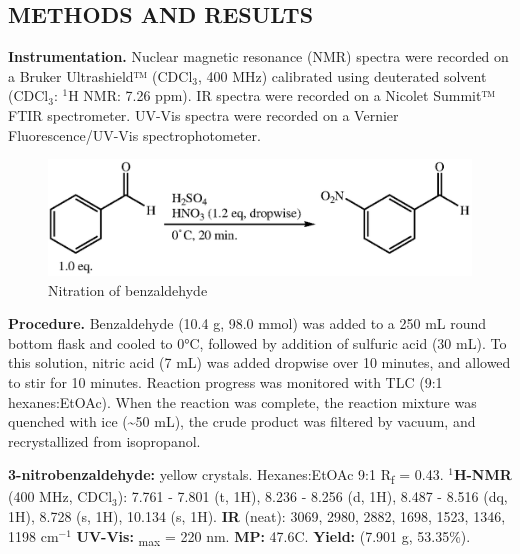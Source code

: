 \documentclass[12pt]{article}
\let\bf\textbf
\begin{document}
\subsection*{METHODS AND RESULTS}
\bf{Instrumentation.} Nuclear magnetic resonance (NMR) spectra were recorded on a Bruker Ultrashield™ (CDCl$_3$, 400 MHz) calibrated using deuterated solvent (CDCl$_3$: $^1$H NMR: 7.26 ppm). IR spectra were recorded on a Nicolet Summit™ FTIR spectrometer. UV-Vis spectra were recorded on a Vernier Fluorescence/UV-Vis spectrophotometer.

\begin{figure}[H]
    \centering
    \includegraphics[scale=0.8]{schemes/nitration.eps}
    \caption{Nitration of benzaldehyde}
\end{figure}
\bf{Procedure.} Benzaldehyde (10.4 g, 98.0 mmol) was added to a 250 mL round bottom flask and cooled to 0°C, followed by addition of sulfuric acid (30 mL). To this solution, nitric acid (7 mL) was added dropwise over 10 minutes, and allowed to stir for 10 minutes. Reaction progress was monitored with TLC (9:1 hexanes:EtOAc). When the reaction was complete, the reaction mixture was quenched with ice (\textasciitilde 50 mL), the crude product was filtered by vacuum, and recrystallized from isopropanol.

\noindent\bf{3-nitrobenzaldehyde:} yellow crystals. Hexanes:EtOAc 9:1 R\textsubscript{f} = 0.43. \bf{$^1$H-NMR} (400 MHz, CDCl$_3$): \textdelta\hspace{0mm} 7.761 - 7.801 (t, 1H), 8.236 - 8.256 (d, 1H), 8.487 - 8.516 (dq, 1H), 8.728 (s, 1H), 10.134 (s, 1H). \bf{IR} (neat): 3069, 2980, 2882, 1698, 1523, 1346, 1198 cm$^{-1}$ \bf{UV-Vis:} \textlambda\textsubscript{max} = 220 nm. \bf{MP:} 47.6\degree C. \bf{Yield:} (7.901 g, 53.35\%).
\end{document}
